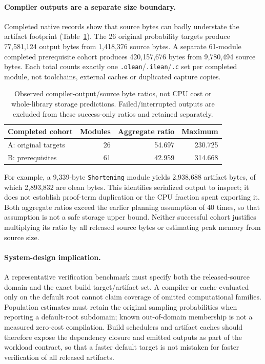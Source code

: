 \documentclass[10pt,twocolumn]{article}
\begin{document}
\paragraph{Compiler outputs are a separate size boundary.}
Completed native records show that source bytes can badly understate the
artifact footprint (Table~\ref{tab:artifact-growth}).
The 26 original probability targets produce 77,581,124 output bytes from
1,418,376 source bytes. A separate 61-module completed prerequisite cohort
produces 420,157,676 bytes from 9,780,494 source bytes.
Each total counts exactly one \texttt{.olean}/\texttt{.ilean}/\texttt{.c}
set per completed module, not toolchains, external caches or duplicated
capture copies.

\begin{table}[t]
\centering\small
\setlength{\tabcolsep}{4pt}
\begin{tabular}{@{}lrrr@{}}
\toprule
Completed cohort & Modules & Aggregate ratio & Maximum\\
\midrule
A: original targets &26&54.697&230.725\\
B: prerequisites &61&42.959&314.668\\
\bottomrule
\end{tabular}
\caption{Observed compiler-output/source byte ratios, not CPU cost or
whole-library storage predictions. Failed/interrupted outputs are excluded
from these success-only ratios and retained separately.}
\label{tab:artifact-growth}
\end{table}

For example, a 9,339-byte \texttt{Shortening} module yields 2,938,688
artifact bytes, of which 2,893,832 are olean bytes.
This identifies serialized output to inspect; it does not establish
proof-term duplication or the CPU fraction spent exporting it.
Both aggregate ratios exceed the earlier planning assumption of 40 times,
so that assumption is not a safe storage upper bound.
Neither successful cohort justifies multiplying its ratio by all released
source bytes or estimating peak memory from source size.

\paragraph{System-design implication.}
A representative verification benchmark must specify both the released-source
domain and the exact build target/artifact set.
A compiler or cache evaluated only on the default root cannot claim coverage
of omitted computational families. Population estimates must retain the
original sampling probabilities when reporting a default-root subdomain;
known out-of-domain membership is not a measured zero-cost compilation.
Build schedulers and artifact caches should therefore expose the dependency
closure and emitted outputs as part of the workload contract, so that a
faster default target is not mistaken for faster verification of all
released artifacts.
\end{document}

